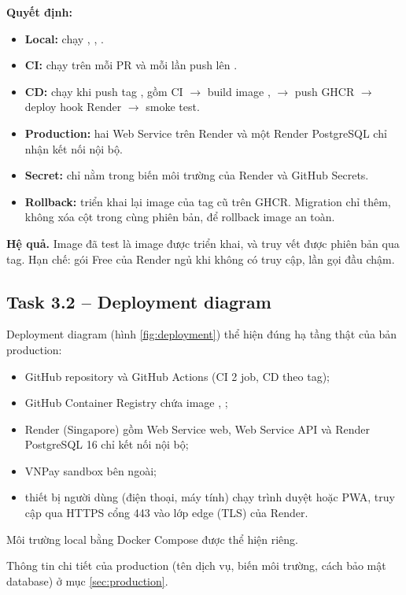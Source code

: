 \textbf{Quyết định:}
\begin{itemize}
\item \textbf{Local:}  chạy , , .
\item \textbf{CI:} chạy trên mỗi PR và mỗi lần push lên .
\item \textbf{CD:} chạy khi push tag , gồm CI $\rightarrow$ build image ,  $\rightarrow$ push GHCR $\rightarrow$ deploy hook Render $\rightarrow$ smoke test.
\item \textbf{Production:} hai Web Service trên Render và một Render PostgreSQL chỉ nhận kết nối nội bộ.
\item \textbf{Secret:} chỉ nằm trong biến môi trường của Render và GitHub Secrets.
\item \textbf{Rollback:} triển khai lại image của tag cũ trên GHCR. Migration chỉ thêm, không xóa cột trong cùng phiên bản, để rollback image an toàn.
\end{itemize}

\textbf{Hệ quả.} Image đã test là image được triển khai, và truy vết được phiên bản qua tag. Hạn chế: gói Free của Render ngủ khi không có truy cập, lần gọi đầu chậm.

\subsection{Task 3.2 -- Deployment diagram}
Deployment diagram (hình \ref{fig:deployment}) thể hiện đúng hạ tầng thật của bản production:
\begin{itemize}
\item GitHub repository và GitHub Actions (CI 2 job, CD theo tag);
\item GitHub Container Registry chứa image , ;
\item Render (Singapore) gồm Web Service web, Web Service API và Render PostgreSQL 16 chỉ kết nối nội bộ;
\item VNPay sandbox bên ngoài;
\item thiết bị người dùng (điện thoại, máy tính) chạy trình duyệt hoặc PWA, truy cập qua HTTPS cổng 443 vào lớp edge (TLS) của Render.
\end{itemize}

Môi trường local bằng Docker Compose được thể hiện riêng.


Thông tin chi tiết của production (tên dịch vụ, biến môi trường, cách bảo mật database) ở mục \ref{sec:production}.
